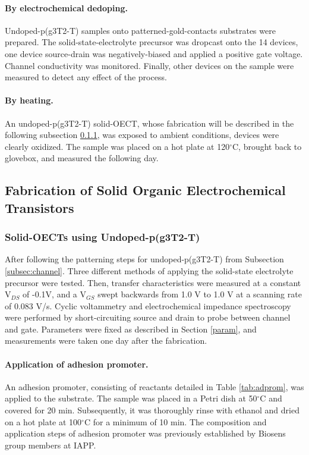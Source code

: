 \paragraph{By electrochemical dedoping.}Undoped-p(g3T2-T) samples onto patterned-gold-contacts substrates were prepared. The solid-state-electrolyte precursor was dropcast onto the 14 devices, one device source-drain was negatively-biased and applied a positive gate voltage. Channel conductivity was monitored. Finally, other devices on the sample were measured to detect any effect of the process.

\paragraph{By heating.}An undoped-p(g3T2-T) solid-OECT, whose fabrication will be described in the following subsection \ref{subsec:solidOECT}, was exposed to ambient conditions, devices were clearly oxidized. The sample was placed on a hot plate at 120$^{\circ}$C, brought back to glovebox, and measured the following day.  %

\subsection{Fabrication of Solid Organic Electrochemical Transistors} \label{subsec:soect}

\subsubsection{Solid-OECTs using Undoped-p(g3T2-T)} \label{subsec:solidOECT}
After following the patterning steps for undoped-p(g3T2-T) from Subsection \ref{subsec:channel}. Three different methods of applying the solid-state electrolyte precursor were tested. Then, transfer characteristics were measured at a constant V$_{DS}$ of -0.1V, and a  V$_{GS}$ swept backwards from 1.0 V to 1.0 V at a scanning rate of 0.083 V/s. Cyclic voltammetry and electrochemical impedance spectroscopy were performed by short-circuiting source and drain to probe between channel and gate. Parameters were fixed as described in Section \ref{param}, and measurements were taken one day after the fabrication.

\paragraph{Application of adhesion promoter.}An adhesion promoter, consisting of reactants detailed in Table \ref{tab:adprom}, was applied to the substrate. The sample was placed in a Petri dish at 50$^{\circ}$C and covered for 20 min. Subsequently, it was thoroughly rinse with ethanol and dried on a hot plate at 100$^{\circ}$C for a minimum of 10 min. The composition and application steps of adhesion promoter was previously established by Biosens group members at IAPP. 

